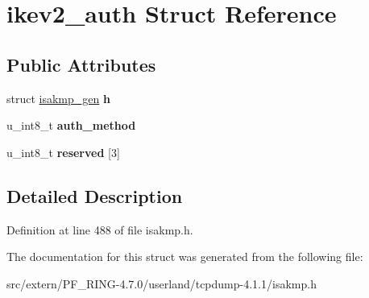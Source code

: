 \hypertarget{structikev2__auth}{
\section{ikev2\_\-auth Struct Reference}
\label{structikev2__auth}
}
\subsection*{Public Attributes}
\begin{DoxyCompactItemize}
\item 
\hypertarget{structikev2__auth_a49fd30111f47d3ef145803076bfe164d}{
struct \hyperlink{structisakmp__gen}{isakmp\_\-gen} {\bfseries h}}
\label{structikev2__auth_a49fd30111f47d3ef145803076bfe164d}

\item 
\hypertarget{structikev2__auth_a9028ed3f6d9648c6e8793454f816084d}{
u\_\-int8\_\-t {\bfseries auth\_\-method}}
\label{structikev2__auth_a9028ed3f6d9648c6e8793454f816084d}

\item 
\hypertarget{structikev2__auth_ab1126b60690c83e64cb38acf3bb8f850}{
u\_\-int8\_\-t {\bfseries reserved} \mbox{[}3\mbox{]}}
\label{structikev2__auth_ab1126b60690c83e64cb38acf3bb8f850}

\end{DoxyCompactItemize}


\subsection{Detailed Description}


Definition at line 488 of file isakmp.h.



The documentation for this struct was generated from the following file:\begin{DoxyCompactItemize}
\item 
src/extern/PF\_\-RING-\/4.7.0/userland/tcpdump-\/4.1.1/isakmp.h\end{DoxyCompactItemize}

